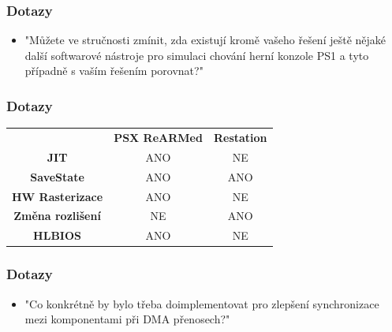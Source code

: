 \begin{frame}
  \frametitle{Dotazy}
  \begin{itemize}
    \item "Můžete ve stručnosti zmínit, zda existují kromě vašeho řešení ještě nějaké další softwarové nástroje pro simulaci chování herní konzole PS1 a tyto případně s vaším řešením porovnat?"
  \end{itemize}
\end{frame}

\begin{frame}
  \frametitle{Dotazy}
  \begin{center}
  \begin{tabular}{|c|c|c|}
      \hline
       & \textbf{PSX ReARMed} & \textbf{Restation} \\
      \textbf{JIT} & \color{green}ANO & \color{red}NE \\
      \textbf{SaveState} & \color{green}ANO & \color{green}ANO \\
      \textbf{HW Rasterizace} & \color{green}ANO & \color{red}NE \\
      \textbf{Změna rozlišení} & \color{red}NE & \color{green}ANO \\
      \textbf{HLBIOS} & \color{green}ANO & \color{red}NE \\
      \hline
  \end{tabular}
  \end{center}
\end{frame}

\begin{frame}
  \frametitle{Dotazy}
  \begin{itemize}
    \item "Co konkrétně by bylo třeba doimplementovat pro zlepšení synchronizace mezi komponentami při DMA přenosech?"
  \end{itemize}
\end{frame}
